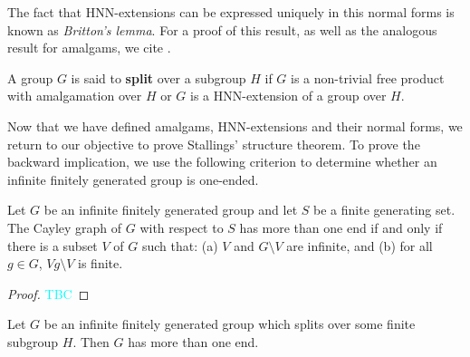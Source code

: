 The fact that HNN-extensions can be expressed uniquely in this normal forms is known as \emph{Britton's lemma}. For a proof of this result, as well as the analogous result for amalgams, we cite \cite[p.7--8]{K10}.

\begin{definition}[Splitting]
    A group \(G\) is said to \textbf{split} over a subgroup \(H\) if \(G\) is a non-trivial free product with amalgamation over \(H\) or \(G\) is a HNN-extension of a group over \(H\). 
\end{definition}

 Now that we have defined amalgams, HNN-extensions and their normal forms, we return to our objective to prove Stallings' structure theorem. To prove the backward implication, we use the following criterion to determine whether an infinite finitely generated group is one-ended.
 
\begin{proposition} 
\label{prop:criterion}
Let \(G\) be an infinite finitely generated group and let \(S\) be a  finite generating set.
The Cayley graph of \(G\) with respect to \(S\) has more than one end if and only if there is a subset \(V\) of \(G\) such that:
    (a) \(V\) and \(G \setminus V\) are infinite, and
    (b) for all \(g \in G\), \(Vg \setminus V\) is finite.
\end{proposition}

\begin{proof}
\textcolor{cyan}{TBC}
\end{proof}

\begin{theorem}
    Let \(G\) be an infinite finitely generated group which splits over some finite subgroup \(H\). Then \(G\) has more than one end.
\end{theorem}

